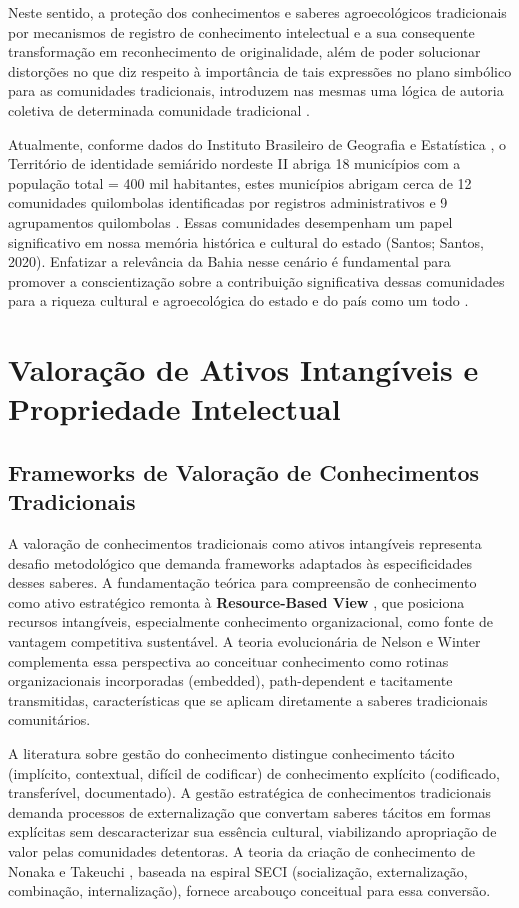 Neste sentido, a proteção dos conhecimentos e saberes agroecológicos tradicionais por mecanismos de registro de conhecimento intelectual e a sua consequente transformação em reconhecimento de originalidade, além de poder solucionar distorções no que diz respeito à importância de tais expressões no plano simbólico para as comunidades tradicionais, introduzem nas mesmas uma lógica de autoria coletiva de determinada comunidade tradicional \cite{LimaVerdanRangel2018}.

Atualmente, conforme dados do Instituto Brasileiro de Geografia e Estatística \cite{IBGE2010}, o Território de identidade semiárido nordeste II abriga 18 municípios com a população total = 400 mil habitantes, estes municípios abrigam cerca de 12 comunidades quilombolas identificadas por registros administrativos e 9 agrupamentos quilombolas \cite{IBGE2022}. Essas comunidades desempenham um papel significativo em nossa memória histórica e cultural do estado (Santos; Santos, 2020). Enfatizar a relevância da Bahia nesse cenário é fundamental para promover a conscientização sobre a contribuição significativa dessas comunidades para a riqueza cultural e agroecológica do estado e do país como um todo \cite{Lima2010}.


\section{Valoração de Ativos Intangíveis e Propriedade Intelectual}

\subsection{Frameworks de Valoração de Conhecimentos Tradicionais}

A valoração de conhecimentos tradicionais como ativos intangíveis representa desafio metodológico que demanda frameworks adaptados às especificidades desses saberes. A fundamentação teórica para compreensão de conhecimento como ativo estratégico remonta à \textbf{Resource-Based View} \cite{Penrose1959,Barney1991}, que posiciona recursos intangíveis, especialmente conhecimento organizacional, como fonte de vantagem competitiva sustentável. A teoria evolucionária de Nelson e Winter \cite{Nelson1982} complementa essa perspectiva ao conceituar conhecimento como rotinas organizacionais incorporadas (embedded), path-dependent e tacitamente transmitidas, características que se aplicam diretamente a saberes tradicionais comunitários.

A literatura sobre gestão do conhecimento \cite{Nonaka1995,Grant1996} distingue conhecimento tácito (implícito, contextual, difícil de codificar) de conhecimento explícito (codificado, transferível, documentado). A gestão estratégica de conhecimentos tradicionais demanda processos de externalização que convertam saberes tácitos em formas explícitas sem descaracterizar sua essência cultural, viabilizando apropriação de valor pelas comunidades detentoras. A teoria da criação de conhecimento de Nonaka e Takeuchi \cite{Nonaka1995}, baseada na espiral SECI (socialização, externalização, combinação, internalização), fornece arcabouço conceitual para essa conversão.

